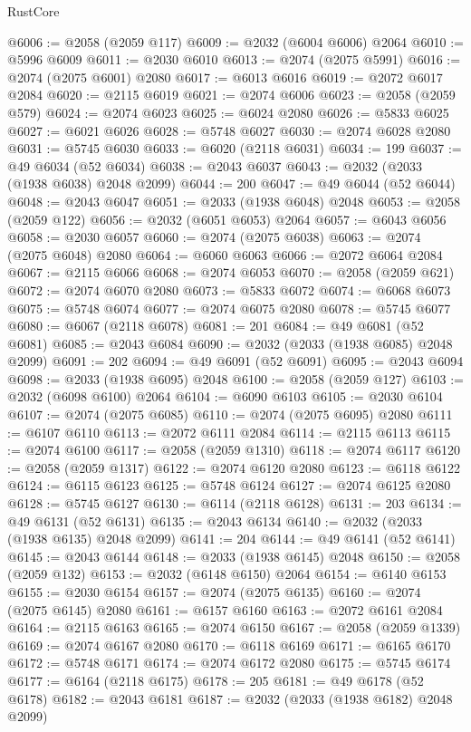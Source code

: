 \begin{lexlean}{RustCore}
\begin{coremodule}
@6006 := @2058 (@2059 @117)
@6009 := @2032 (@6004 @6006) @2064
@6010 := @5996 @6009
@6011 := @2030 @6010
@6013 := @2074 (@2075 @5991)
@6016 := @2074 (@2075 @6001) @2080
@6017 := @6013 @6016
@6019 := @2072 @6017 @2084
@6020 := @2115 @6019
@6021 := @2074 @6006
@6023 := @2058 (@2059 @579)
@6024 := @2074 @6023
@6025 := @6024 @2080
@6026 := @5833 @6025
@6027 := @6021 @6026
@6028 := @5748 @6027
@6030 := @2074 @6028 @2080
@6031 := @5745 @6030
@6033 := @6020 (@2118 @6031)
@6034 := 199
@6037 := @49 @6034 (@52 @6034)
@6038 := @2043 @6037
@6043 := @2032 (@2033 (@1938 @6038) @2048 @2099)
@6044 := 200
@6047 := @49 @6044 (@52 @6044)
@6048 := @2043 @6047
@6051 := @2033 (@1938 @6048) @2048
@6053 := @2058 (@2059 @122)
@6056 := @2032 (@6051 @6053) @2064
@6057 := @6043 @6056
@6058 := @2030 @6057
@6060 := @2074 (@2075 @6038)
@6063 := @2074 (@2075 @6048) @2080
@6064 := @6060 @6063
@6066 := @2072 @6064 @2084
@6067 := @2115 @6066
@6068 := @2074 @6053
@6070 := @2058 (@2059 @621)
@6072 := @2074 @6070 @2080
@6073 := @5833 @6072
@6074 := @6068 @6073
@6075 := @5748 @6074
@6077 := @2074 @6075 @2080
@6078 := @5745 @6077
@6080 := @6067 (@2118 @6078)
@6081 := 201
@6084 := @49 @6081 (@52 @6081)
@6085 := @2043 @6084
@6090 := @2032 (@2033 (@1938 @6085) @2048 @2099)
@6091 := 202
@6094 := @49 @6091 (@52 @6091)
@6095 := @2043 @6094
@6098 := @2033 (@1938 @6095) @2048
@6100 := @2058 (@2059 @127)
@6103 := @2032 (@6098 @6100) @2064
@6104 := @6090 @6103
@6105 := @2030 @6104
@6107 := @2074 (@2075 @6085)
@6110 := @2074 (@2075 @6095) @2080
@6111 := @6107 @6110
@6113 := @2072 @6111 @2084
@6114 := @2115 @6113
@6115 := @2074 @6100
@6117 := @2058 (@2059 @1310)
@6118 := @2074 @6117
@6120 := @2058 (@2059 @1317)
@6122 := @2074 @6120 @2080
@6123 := @6118 @6122
@6124 := @6115 @6123
@6125 := @5748 @6124
@6127 := @2074 @6125 @2080
@6128 := @5745 @6127
@6130 := @6114 (@2118 @6128)
@6131 := 203
@6134 := @49 @6131 (@52 @6131)
@6135 := @2043 @6134
@6140 := @2032 (@2033 (@1938 @6135) @2048 @2099)
@6141 := 204
@6144 := @49 @6141 (@52 @6141)
@6145 := @2043 @6144
@6148 := @2033 (@1938 @6145) @2048
@6150 := @2058 (@2059 @132)
@6153 := @2032 (@6148 @6150) @2064
@6154 := @6140 @6153
@6155 := @2030 @6154
@6157 := @2074 (@2075 @6135)
@6160 := @2074 (@2075 @6145) @2080
@6161 := @6157 @6160
@6163 := @2072 @6161 @2084
@6164 := @2115 @6163
@6165 := @2074 @6150
@6167 := @2058 (@2059 @1339)
@6169 := @2074 @6167 @2080
@6170 := @6118 @6169
@6171 := @6165 @6170
@6172 := @5748 @6171
@6174 := @2074 @6172 @2080
@6175 := @5745 @6174
@6177 := @6164 (@2118 @6175)
@6178 := 205
@6181 := @49 @6178 (@52 @6178)
@6182 := @2043 @6181
@6187 := @2032 (@2033 (@1938 @6182) @2048 @2099)

\end{coremodule}
\end{lexlean}
